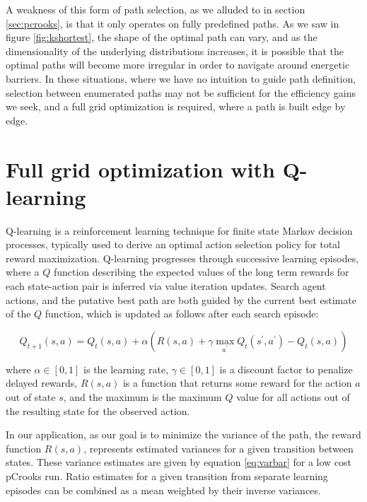 A weakness of this form of path selection, as we alluded to in section \ref{sec:pcrooks}, is that it only operates on fully predefined paths.
As we saw in figure \ref{fig:kshortest}, the shape of the optimal path can vary, and as the dimensionality of the underlying distributions increases, it is possible that the optimal paths will become more irregular in order to navigate around energetic barriers. 
In these situations, where we have no intuition to guide path definition, selection between enumerated paths may not be sufficient for the efficiency gains we seek, and a full grid optimization is required, where a path is built edge by edge.

\section{Full grid optimization with Q-learning}

Q-learning\cite{watkins1992q} is a reinforcement learning technique for finite state Markov decision processes, typically used to derive an optimal action selection policy for total reward maximization.
Q-learning progresses through successive learning episodes, where a $Q$ function describing the expected values of the long term rewards for each state-action pair is inferred via value iteration updates. Search agent actions, and the putative best path are both guided by the current best estimate of the $Q$ function, which is updated as follows after each search episode:

\begin{equation}
    Q_{t+1}(s,a) = Q_t(s,a) + \alpha (R(s,a) + \gamma \max_{a^\prime}Q_t(s^{\prime}, a^{\prime}) - Q_t(s,a))
\end{equation}

\noindent where $\alpha \in [0,1]$ is the learning rate, $\gamma \in [0,1]$ is a discount factor to penalize delayed rewards, $R(s,a)$ is a function that returns some reward for the action $a$ out of state $s$, and the maximum is the maximum $Q$ value for all actions out of the resulting state for the observed action.

In our application, as our goal is to minimize the variance of the path, the reward function $R(s,a)$, represents estimated variances for a given transition between states. 
These variance estimates are given by equation \eqref{eq:varbar} for a low cost pCrooks run.
Ratio estimates for a given transition from separate learning episodes can be combined as a mean weighted by their inverse variances.

